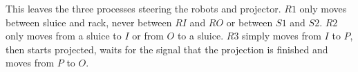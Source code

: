 This leaves the three processes steering the robots and projector. $R1$ only moves between sluice and rack, never between $RI$ and $RO$ or between $S1$ and $S2$. $R2$ only moves from a sluice to $I$ or from $O$ to a sluice. $R3$ simply moves from $I$ to $P$, then starts projected, waits for the signal that the projection is finished and moves from $P$ to $O$.